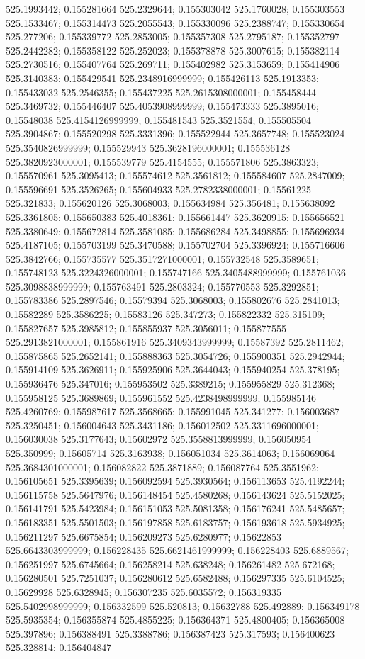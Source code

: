 525.1993442; 0.155281664 525.2329644; 0.155303042 525.1760028; 0.155303553 525.1533467; 0.155314473 525.2055543; 0.155330096 525.2388747; 0.155330654 525.277206; 0.155339772 525.2853005; 0.155357308 525.2795187; 0.155352797 525.2442282; 0.155358122 525.252023; 0.155378878 525.3007615; 0.155382114 525.2730516; 0.155407764 525.269711; 0.155402982 525.3153659; 0.155414906 525.3140383; 0.155429541 525.2348916999999; 0.155426113 525.1913353; 0.155433032 525.2546355; 0.155437225 525.2615308000001; 0.155458444 525.3469732; 0.155446407 525.4053908999999; 0.155473333 525.3895016; 0.15548038 525.4154126999999; 0.155481543 525.3521554; 0.155505504 525.3904867; 0.155520298 525.3331396; 0.155522944 525.3657748; 0.155523024 525.3540826999999; 0.155529943 525.3628196000001; 0.155536128 525.3820923000001; 0.155539779 525.4154555; 0.155571806 525.3863323; 0.155570961 525.3095413; 0.155574612 525.3561812; 0.155584607 525.2847009; 0.155596691 525.3526265; 0.155604933 525.2782338000001; 0.15561225 525.321833; 0.155620126 525.3068003; 0.155634984 525.356481; 0.155638092 525.3361805; 0.155650383 525.4018361; 0.155661447 525.3620915; 0.155656521 525.3380649; 0.155672814 525.3581085; 0.155686284 525.3498855; 0.155696934 525.4187105; 0.155703199 525.3470588; 0.155702704 525.3396924; 0.155716606 525.3842766; 0.155735577 525.3517271000001; 0.155732548 525.3589651; 0.155748123 525.3224326000001; 0.155747166 525.3405488999999; 0.155761036 525.3098838999999; 0.155763491 525.2803324; 0.155770553 525.3292851; 0.155783386 525.2897546; 0.15579394 525.3068003; 0.155802676 525.2841013; 0.15582289 525.3586225; 0.15583126 525.347273; 0.155822332 525.315109; 0.155827657 525.3985812; 0.155855937 525.3056011; 0.155877555 525.2913821000001; 0.155861916 525.3409343999999; 0.15587392 525.2811462; 0.155875865 525.2652141; 0.155888363 525.3054726; 0.155900351 525.2942944; 0.155914109 525.3626911; 0.155925906 525.3644043; 0.155940254 525.378195; 0.155936476 525.347016; 0.155953502 525.3389215; 0.155955829 525.312368; 0.155958125 525.3689869; 0.155961552 525.4238498999999; 0.155985146 525.4260769; 0.155987617 525.3568665; 0.155991045 525.341277; 0.156003687 525.3250451; 0.156004643 525.3431186; 0.156012502 525.3311696000001; 0.156030038 525.3177643; 0.15602972 525.3558813999999; 0.156050954 525.350999; 0.15605714 525.3163938; 0.156051034 525.3614063; 0.156069064 525.3684301000001; 0.156082822 525.3871889; 0.156087764 525.3551962; 0.156105651 525.3395639; 0.156092594 525.3930564; 0.156113653 525.4192244; 0.156115758 525.5647976; 0.156148454 525.4580268; 0.156143624 525.5152025; 0.156141791 525.5423984; 0.156151053 525.5081358; 0.156176241 525.5485657; 0.156183351 525.5501503; 0.156197858 525.6183757; 0.156193618 525.5934925; 0.156211297 525.6675854; 0.156209273 525.6280977; 0.15622853 525.6643303999999; 0.156228435 525.6621461999999; 0.156228403 525.6889567; 0.156251997 525.6745664; 0.156258214 525.638248; 0.156261482 525.672168; 0.156280501 525.7251037; 0.156280612 525.6582488; 0.156297335 525.6104525; 0.15629928 525.6328945; 0.156307235 525.6035572; 0.156319335 525.5402998999999; 0.156332599 525.520813; 0.15632788 525.492889; 0.156349178 525.5935354; 0.156355874 525.4855225; 0.156364371 525.4800405; 0.156365008 525.397896; 0.156388491 525.3388786; 0.156387423 525.317593; 0.156400623 525.328814; 0.156404847 
